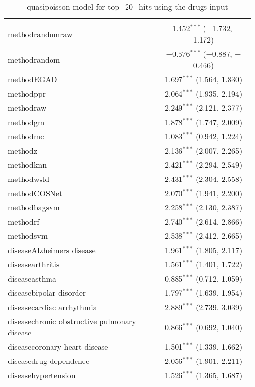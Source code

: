 
\begin{table}[!htbp] \centering 
  \caption{quasipoisson model for top_20_hits using the drugs input} 
  \label{} 
\begin{tabular}{@{\extracolsep{5pt}}lc} 
\\[-1.8ex]\hline 
\hline \\[-1.8ex] 
 methodrandomraw & $-$1.452$^{***}$ ($-$1.732, $-$1.172) \\ 
  methodrandom & $-$0.676$^{***}$ ($-$0.887, $-$0.466) \\ 
  methodEGAD & 1.697$^{***}$ (1.564, 1.830) \\ 
  methodppr & 2.064$^{***}$ (1.935, 2.194) \\ 
  methodraw & 2.249$^{***}$ (2.121, 2.377) \\ 
  methodgm & 1.878$^{***}$ (1.747, 2.009) \\ 
  methodmc & 1.083$^{***}$ (0.942, 1.224) \\ 
  methodz & 2.136$^{***}$ (2.007, 2.265) \\ 
  methodknn & 2.421$^{***}$ (2.294, 2.549) \\ 
  methodwsld & 2.431$^{***}$ (2.304, 2.558) \\ 
  methodCOSNet & 2.070$^{***}$ (1.941, 2.200) \\ 
  methodbagsvm & 2.258$^{***}$ (2.130, 2.387) \\ 
  methodrf & 2.740$^{***}$ (2.614, 2.866) \\ 
  methodsvm & 2.538$^{***}$ (2.412, 2.665) \\ 
  diseaseAlzheimers disease & 1.961$^{***}$ (1.805, 2.117) \\ 
  diseasearthritis & 1.561$^{***}$ (1.401, 1.722) \\ 
  diseaseasthma & 0.885$^{***}$ (0.712, 1.059) \\ 
  diseasebipolar disorder & 1.797$^{***}$ (1.639, 1.954) \\ 
  diseasecardiac arrhythmia & 2.889$^{***}$ (2.739, 3.039) \\ 
  diseasechronic obstructive pulmonary disease & 0.866$^{***}$ (0.692, 1.040) \\ 
  diseasecoronary heart disease & 1.501$^{***}$ (1.339, 1.662) \\ 
  diseasedrug dependence & 2.056$^{***}$ (1.901, 2.211) \\ 
  diseasehypertension & 1.526$^{***}$ (1.365, 1.687) \\ 

\end{tabular}
\end{table}
